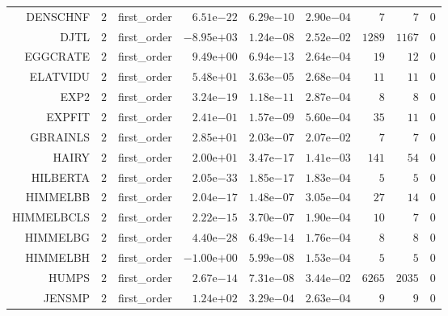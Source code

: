 \begin{longtable}{rrrrrrrrr}
DENSCHNF & \(     2\) & first\_order & \( 6.51\)e\(-22\) & \( 6.29\)e\(-10\) & \( 2.90\)e\(-04\) & \(     7\) & \(     7\) & \(     0\) \\
DJTL & \(     2\) & first\_order & \(-8.95\)e\(+03\) & \( 1.24\)e\(-08\) & \( 2.52\)e\(-02\) & \(  1289\) & \(  1167\) & \(     0\) \\
EGGCRATE & \(     2\) & first\_order & \( 9.49\)e\(+00\) & \( 6.94\)e\(-13\) & \( 2.64\)e\(-04\) & \(    19\) & \(    12\) & \(     0\) \\
ELATVIDU & \(     2\) & first\_order & \( 5.48\)e\(+01\) & \( 3.63\)e\(-05\) & \( 2.68\)e\(-04\) & \(    11\) & \(    11\) & \(     0\) \\
EXP2 & \(     2\) & first\_order & \( 3.24\)e\(-19\) & \( 1.18\)e\(-11\) & \( 2.87\)e\(-04\) & \(     8\) & \(     8\) & \(     0\) \\
EXPFIT & \(     2\) & first\_order & \( 2.41\)e\(-01\) & \( 1.57\)e\(-09\) & \( 5.60\)e\(-04\) & \(    35\) & \(    11\) & \(     0\) \\
GBRAINLS & \(     2\) & first\_order & \( 2.85\)e\(+01\) & \( 2.03\)e\(-07\) & \( 2.07\)e\(-02\) & \(     7\) & \(     7\) & \(     0\) \\
HAIRY & \(     2\) & first\_order & \( 2.00\)e\(+01\) & \( 3.47\)e\(-17\) & \( 1.41\)e\(-03\) & \(   141\) & \(    54\) & \(     0\) \\
HILBERTA & \(     2\) & first\_order & \( 2.05\)e\(-33\) & \( 1.85\)e\(-17\) & \( 1.83\)e\(-04\) & \(     5\) & \(     5\) & \(     0\) \\
HIMMELBB & \(     2\) & first\_order & \( 2.04\)e\(-17\) & \( 1.48\)e\(-07\) & \( 3.05\)e\(-04\) & \(    27\) & \(    14\) & \(     0\) \\
HIMMELBCLS & \(     2\) & first\_order & \( 2.22\)e\(-15\) & \( 3.70\)e\(-07\) & \( 1.90\)e\(-04\) & \(    10\) & \(     7\) & \(     0\) \\
HIMMELBG & \(     2\) & first\_order & \( 4.40\)e\(-28\) & \( 6.49\)e\(-14\) & \( 1.76\)e\(-04\) & \(     8\) & \(     8\) & \(     0\) \\
HIMMELBH & \(     2\) & first\_order & \(-1.00\)e\(+00\) & \( 5.99\)e\(-08\) & \( 1.53\)e\(-04\) & \(     5\) & \(     5\) & \(     0\) \\
HUMPS & \(     2\) & first\_order & \( 2.67\)e\(-14\) & \( 7.31\)e\(-08\) & \( 3.44\)e\(-02\) & \(  6265\) & \(  2035\) & \(     0\) \\
JENSMP & \(     2\) & first\_order & \( 1.24\)e\(+02\) & \( 3.29\)e\(-04\) & \( 2.63\)e\(-04\) & \(     9\) & \(     9\) & \(     0\) \\

\end{longtable}
